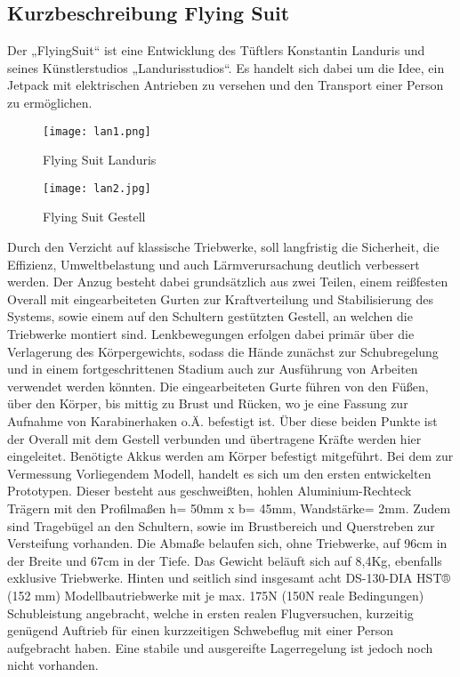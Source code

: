\subsection{Kurzbeschreibung Flying Suit}
Der „FlyingSuit“ ist eine Entwicklung des Tüftlers Konstantin Landuris und seines Künstlerstudios „Landurisstudios“.
Es handelt sich dabei um die Idee, ein Jetpack mit elektrischen Antrieben zu versehen und den Transport einer Person zu ermöglichen.

\begin{figure}[htbp]
    \centering
    \begin{minipage}{0.48\textwidth}
        \centering
        \texttt{[image: lan1.png]}
        \caption[Flying Suit Landuris (Abbildungsverzeichnis)]{Flying Suit Landuris}
        \cite{Landuris}
        \label{fig:lan1}
    \end{minipage}
    \hfill
    \begin{minipage}{0.48\textwidth}
        \centering
        \texttt{[image: lan2.jpg]}
        \caption[Flying Suit Gestell (Abbildungsverzeichnis)]{Flying Suit Gestell}
        \cite{Landuris}

        \label{fig:lan2}
    \end{minipage}
\end{figure}

Durch den Verzicht auf klassische Triebwerke, soll langfristig die Sicherheit, die Effizienz, Umweltbelastung und auch Lärmverursachung deutlich verbessert werden.
Der Anzug besteht dabei grundsätzlich aus zwei Teilen, einem reißfesten Overall mit eingearbeiteten Gurten zur Kraftverteilung und Stabilisierung des Systems,
sowie einem auf den Schultern gestützten Gestell, an welchen die Triebwerke montiert sind. Lenkbewegungen erfolgen dabei primär über die Verlagerung des Körpergewichts,
sodass die Hände zunächst zur Schubregelung und in einem fortgeschrittenen Stadium auch zur Ausführung von Arbeiten verwendet werden könnten.
Die eingearbeiteten Gurte führen von den Füßen, über den Körper, bis mittig zu Brust und Rücken, wo je eine Fassung zur Aufnahme von Karabinerhaken o.Ä. befestigt ist.
Über diese beiden Punkte ist der Overall mit dem Gestell verbunden und übertragene Kräfte werden hier eingeleitet. Benötigte Akkus werden am Körper befestigt mitgeführt. 
Bei dem zur Vermessung Vorliegendem Modell, handelt es sich um den ersten entwickelten Prototypen.
Dieser besteht aus geschweißten, hohlen Aluminium-Rechteck Trägern mit den Profilmaßen h= 50mm x b= 45mm, Wandstärke= 2mm.
Zudem sind Tragebügel an den Schultern, sowie im Brustbereich und Querstreben zur Versteifung vorhanden.
Die Abmaße belaufen sich, ohne Triebwerke, auf 96cm in der Breite und 67cm in der Tiefe. Das Gewicht beläuft sich auf 8,4Kg, ebenfalls exklusive Triebwerke.
Hinten und seitlich sind insgesamt acht DS-130-DIA HST® (152 mm) Modellbautriebwerke mit je max. 175N (150N reale Bedingungen) Schubleistung angebracht,
welche in ersten realen Flugversuchen, kurzeitig genügend Auftrieb für einen kurzzeitigen Schwebeflug mit einer Person aufgebracht haben.
Eine stabile und ausgereifte Lagerregelung ist jedoch noch nicht vorhanden.

